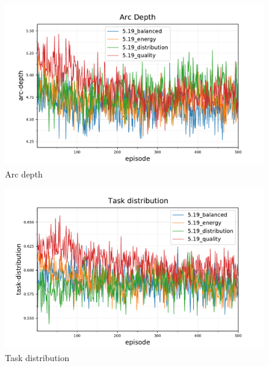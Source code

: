 \begin{figure}[ht]
	\centering
	\includegraphics[width=0.7\linewidth]{5_ctv-arc-depth}
	\captionsetup{labelfont=bf,singlelinecheck=on}
	\caption{Arc depth}
	\label{fig:5_ctv-arc-depth}
\end{figure}
\begin{figure}[ht]
	\centering
	\includegraphics[width=0.7\linewidth]{5_ctv-task-distribution}
	\captionsetup{labelfont=bf,singlelinecheck=on}
	\caption{Task distribution}
	\label{fig:5_ctv-task-distribution}
\end{figure}